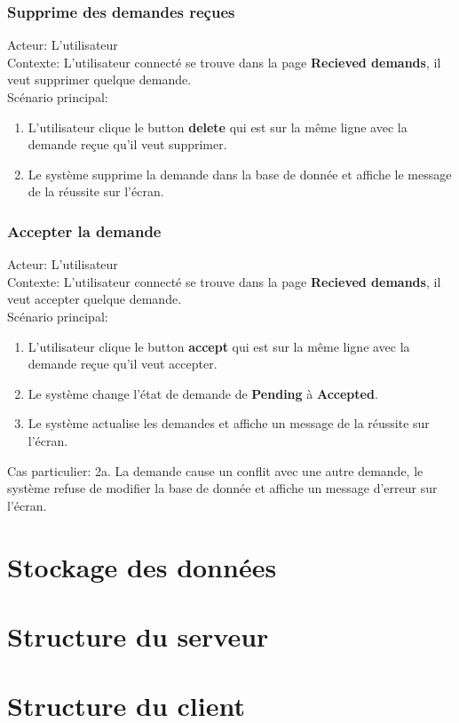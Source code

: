 \documentclass[14px]{article}
\begin{document}
\subsubsection{Supprime des demandes reçues}
Acteur: L'utilisateur\\
Contexte: L'utilisateur connecté se trouve dans la page \textbf{Recieved demands}, il veut supprimer quelque demande.\\
Scénario principal:
\begin{enumerate}
	\item L'utilisateur clique le button \textbf{delete} qui est sur la même ligne avec la demande reçue qu'il veut supprimer.
	\item Le système supprime la demande dans la base de donnée et affiche le message de la réussite sur l'écran.
\end{enumerate}

\subsubsection{Accepter la demande}
Acteur: L'utilisateur\\
Contexte: L'utilisateur connecté se trouve dans la page \textbf{Recieved demands}, il veut accepter quelque demande.\\
Scénario principal:
\begin{enumerate}
	\item L'utilisateur clique le button \textbf{accept} qui est sur la même ligne avec la demande reçue qu'il veut accepter.
	\item Le système change l'état de demande de \textbf{Pending} à \textbf{Accepted}.
	\item Le système actualise les demandes et affiche un message de la réussite sur l'écran.
\end{enumerate}
Cas particulier:
2a. La demande cause un conflit avec une autre demande, le système refuse de modifier la base de donnée et affiche un message d'erreur sur l'écran.


\section{Stockage des données}

\section{Structure du serveur}

\section{Structure du client}
\end{document}
